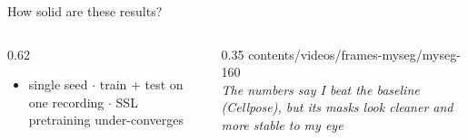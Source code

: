 \begin{frame}[t]{How solid are these results?}
\begin{columns}[c]
\begin{column}{0.62\textwidth}
{\begin{itemize}
      zero-shot
\item single seed $\cdot$ train + test on one recording $\cdot$ SSL pretraining
      under-converges
\end{itemize}}
\end{column}
\hfill%
\begin{column}{0.35\textwidth}
\centering
{}%
{contents/videos/frames-myseg/myseg-}{1}{60}\\[0.3em]
{\scriptsize\itshape The numbers say I beat the baseline (Cellpose), but its
 masks look cleaner and more stable to my eye}
\end{column}
\end{columns}
\end{frame}
